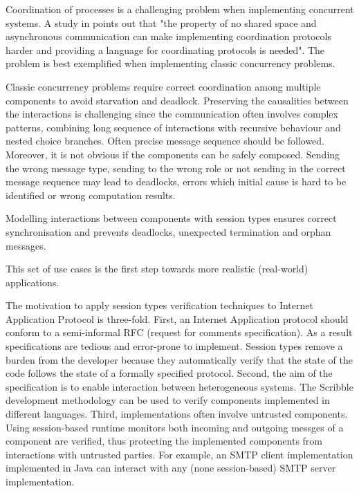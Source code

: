 

 Coordination of processes is a challenging problem when implementing concurrent systems.
A study in \cite{ActorCoordinationStudy} points out that "the property of no shared space and asynchronous
communication can make implementing coordination protocols harder and providing a language
for coordinating protocols is needed". The problem is best exemplified when implementing classic concurrency problems.

Classic concurrency problems require correct coordination among multiple components to avoid starvation and deadlock. Preserving the causalities between the interactions is challenging since the communication often involves complex patterns, combining long sequence of interactions with recursive behaviour and nested choice branches.
Often precise message sequence should be followed. Moreover, it is not obvious if the components can be safely composed. Sending the wrong message type, sending to the wrong role or not sending in the correct message sequence may lead to deadlocks, errors which initial cause is hard to be identified or wrong computation results.


Modelling interactions between components with session types ensures correct synchronisation and prevents deadlocks, unexpected termination and orphan messages.


This set of use cases is the first step towards more realistic (real-world) applications.

The motivation to apply session types verification techniques to Internet Application Protocol is three-fold.
First, an Internet Application protocol should conform to a semi-informal RFC (request for comments specification).
As a result specifications are tedious and error-prone to implement. Session types remove a burden from the developer because they automatically verify that the state of the code follows the state of a formally specified protocol. Second, the aim of the specification is to enable interaction between heterogeneous systems. The Scribble development methodology can be used to verify components implemented in different languages. Third, implementations often involve untrusted components. Using session-based runtime monitors both incoming and outgoing messges of a component are verified, thus protecting the implemented components from interactions with untrusted parties. For example, an SMTP client implementation implemented in Java can interact with any (none session-based) SMTP server implementation.

